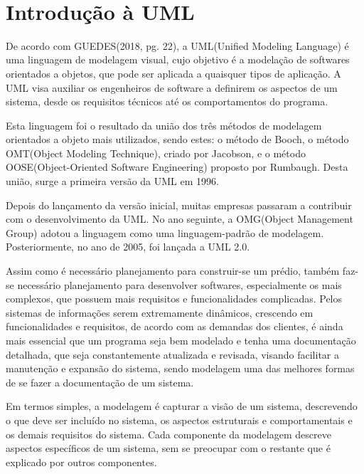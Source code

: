 \documentclass[12pt,openright,oneside,a4paper,
	chapter=TITLE,
	section=TITLE,
	english,brazil]{abntex2}
\author{Heber Ferreira Barra \\ João Gabriel de Cristo}
\date{2024}
\renewcommand{\ABNTEXchapterfont}{\bfseries\MakeUppercase\sffamily}
\renewcommand{\imprimircapa}{%
	\begin{capa}
		\center
		\ABNTEXchapterfont\bfseries\MakeUppercase\imprimirinstituicao\\
		\vspace*{1cm}
		\ABNTEXchapterfont\bfseries\MakeUppercase\imprimirautor
		\vfill
		\begin{center}
			\ABNTEXchapterfont\bfseries\MakeUppercase\imprimirtitulo
		\end{center}
		\vfill

		\bfseries\MakeUppercase\imprimirlocal

		\bfseries\MakeUppercase\imprimirdata

		\vspace*{1cm}
	\end{capa}
}
\begin{document}
\imprimircapa
\imprimirfolhaderosto

\listoffigures*
\cleardoublepage

\tableofcontents*
\cleardoublepage

\textual
\chapter{Introdução à UML}
De acordo com GUEDES(2018, pg. 22), a UML(Unified Modeling Language) é uma linguagem de modelagem visual, cujo objetivo é a modelação de softwares orientados a objetos, que pode ser aplicada a quaisquer tipos de aplicação. A UML visa auxiliar os engenheiros de software a definirem os aspectos de um sistema, desde os requisitos técnicos até os comportamentos do programa.

Esta linguagem foi o resultado da união dos três métodos de modelagem orientados a objeto mais utilizados, sendo estes: o método de Booch, o método OMT(Object Modeling Technique), criado por Jacobson, e o método OOSE(Object-Oriented Software Engineering) proposto por Rumbaugh. Desta união, surge a primeira versão da UML em 1996. 

Depois do lançamento da versão inicial, muitas empresas passaram a contribuir com o desenvolvimento da UML. No ano seguinte, a OMG(Object Management Group) adotou a linguagem como uma linguagem-padrão de modelagem. Posteriormente, no ano de 2005, foi lançada a UML 2.0.

Assim como é necessário planejamento para construir-se um prédio, também faz-se necessário planejamento para desenvolver softwares, especialmente os mais complexos, que possuem mais requisitos e funcionalidades complicadas. Pelos sistemas de informações serem extremamente dinâmicos, crescendo em funcionalidades e requisitos, de acordo com as demandas dos clientes, é ainda mais essencial que um programa seja bem modelado e tenha uma documentação detalhada, que seja constantemente atualizada e revisada, visando facilitar  a manutenção e expansão do sistema, sendo modelagem uma das melhores formas de se fazer a documentação de um sistema.

Em termos simples, a modelagem é capturar a visão de um sistema, descrevendo o que deve ser incluído no sistema, os aspectos estruturais e comportamentais e os demais requisitos do sistema. Cada componente da modelagem descreve aspectos específicos de um sistema, sem se preocupar com o restante que é explicado por outros componentes.
\end{document}
